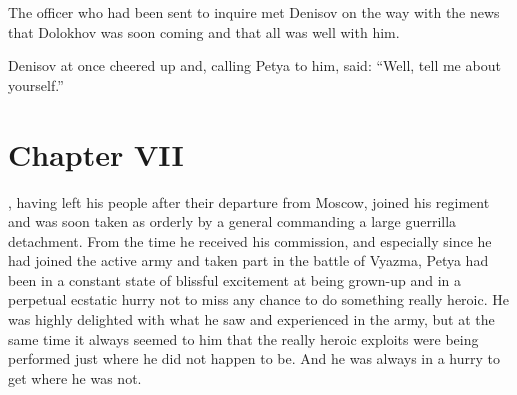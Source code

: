 The officer who had been sent to inquire met Denisov on the way
with the news that Dolokhov was soon coming and that all was well
with him.

Denisov at once cheered up and, calling Petya to him, said:
``Well, tell me about yourself.''


\chapter*{Chapter VII} \ifaudio {}
\fi

, having left his people after their departure from Moscow,
joined his regiment and was soon taken as orderly by a general
commanding a large guerrilla detachment. From the time he
received his commission, and especially since he had joined the
active army and taken part in the battle of Vyazma, Petya had
been in a constant state of blissful excitement at being grown-up
and in a perpetual ecstatic hurry not to miss any chance to do
something really heroic. He was highly delighted with what he saw
and experienced in the army, but at the same time it always
seemed to him that the really heroic exploits were being
performed just where he did not happen to be. And he was always
in a hurry to get where he was not.

